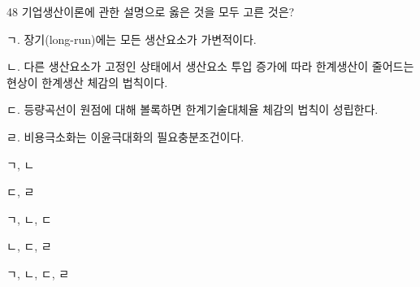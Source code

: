 \begin{question}{48}
기업생산이론에 관한 설명으로 옳은 것을 모두 고른 것은?
\begin{framedtext}
ㄱ. 장기(long-run)에는 모든 생산요소가 가변적이다. \par
ㄴ. 다른 생산요소가 고정인 상태에서 생산요소 투입 증가에 따라 한계생산이 줄어드는 현상이 한계생산 체감의 법칙이다. \par
ㄷ. 등량곡선이 원점에 대해 볼록하면 한계기술대체율 체감의 법칙이 성립한다. \par
ㄹ. 비용극소화는 이윤극대화의 필요충분조건이다. \par
\end{framedtext}
\begin{choices}
  \item ㄱ, ㄴ
  \item ㄷ, ㄹ
  \item ㄱ, ㄴ, ㄷ
  \item ㄴ, ㄷ, ㄹ
  \item ㄱ, ㄴ, ㄷ, ㄹ
\end{choices}
\end{question}
